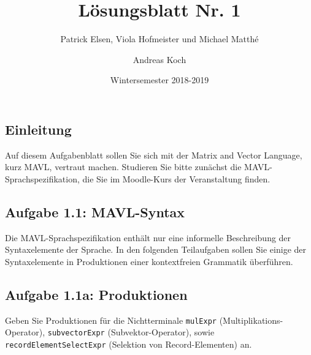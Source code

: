 \documentclass[
  ngerman,
  DIV=14
]{scrartcl}
\title{Lösungsblatt Nr. 1}
\date{Wintersemester 2018-2019}
\author{Andreas Koch}
\subtitle{Patrick Elsen, Viola Hofmeister und Michael Matthé}
\begin{document}
\maketitle

\subsection*{Einleitung}

Auf diesem Aufgabenblatt sollen Sie sich mit der Matrix and Vector Language, kurz MAVL, vertraut machen. Studieren Sie bitte zunächst die MAVL-Sprachspezifikation, die Sie im Moodle-Kurs der Veranstaltung finden.

\subsection*{Aufgabe 1.1: MAVL-Syntax}

Die MAVL-Sprachspezifikation enthält nur eine informelle Beschreibung der Syntaxelemente der Sprache. In den folgenden Teilaufgaben sollen Sie einige der Syntaxelemente in Produktionen einer kontextfreien Grammatik überführen.

\subsection*{Aufgabe 1.1a: Produktionen}

Geben Sie Produktionen für die Nichtterminale \texttt{mulExpr} (Multiplikations-Operator), \texttt{subvectorExpr} (Subvektor-Operator), sowie \texttt{recordElementSelectExpr} (Selektion von Record-Elementen) an.
\end{document}
